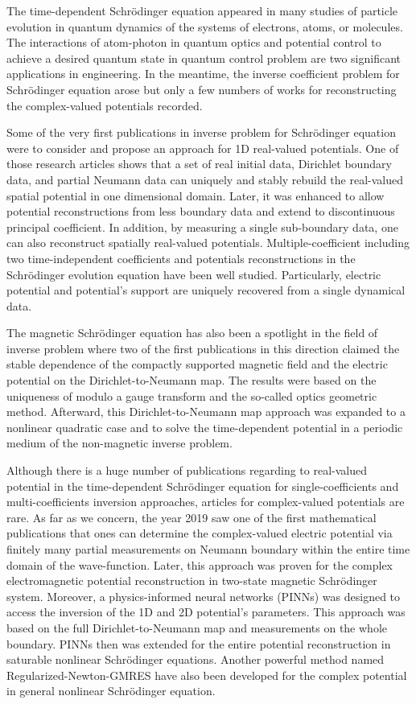 \documentclass[a4paper,fleqn]{cas-sc}
\begin{document}
The time-dependent Schr\"odinger equation appeared in many studies of particle evolution in quantum dynamics of the systems of electrons, atoms, or molecules. The interactions of atom-photon in quantum optics and potential control to achieve a desired quantum state in quantum control problem are two significant applications in engineering. In the meantime, the inverse coefficient problem for Schr\"odinger equation arose but only a few numbers of works for reconstructing the complex-valued potentials recorded.

Some of the very first publications in inverse problem for Schr\"odinger equation were to consider and propose an approach for 1D real-valued potentials. One of those research articles shows that a set of real initial data, Dirichlet boundary data, and partial Neumann data can uniquely and stably rebuild the real-valued spatial potential in one dimensional domain. Later, it was enhanced to allow potential reconstructions from less boundary data and extend to discontinuous principal coefficient. In addition, by measuring a single sub-boundary data, one can also reconstruct spatially real-valued potentials. Multiple-coefficient including two time-independent coefficients and potentials reconstructions in the Schr\"odinger evolution equation have been well studied. Particularly, electric potential and potential's support are  uniquely recovered from a single dynamical data.

The magnetic Schr\"odinger equation has also been a spotlight in the field of inverse problem where two of the first publications in this direction claimed the stable dependence of the compactly supported magnetic field and the electric potential on the Dirichlet-to-Neumann map. The results were based on the uniqueness of modulo a gauge transform and the so-called optics geometric method. Afterward, this Dirichlet-to-Neumann map approach was expanded to a nonlinear quadratic case and to solve the time-dependent potential in a periodic medium of the non-magnetic inverse problem.

Although there is a huge number of publications regarding to real-valued potential in the time-dependent Schr\"odinger equation for single-coefficients and multi-coefficients inversion approaches, articles for complex-valued potentials are rare. As far as we concern, the year 2019 saw one of the first mathematical publications that ones can determine the complex-valued electric potential via finitely many partial measurements on Neumann boundary within the entire time domain of the wave-function. Later, this approach was proven for the complex electromagnetic potential reconstruction in two-state magnetic Schr\"odinger system. Moreover, a physics-informed neural networks (PINNs) was designed to access the inversion of the 1D and 2D potential's parameters. This approach was based on the full Dirichlet-to-Neumann map and measurements on the whole boundary. PINNs then was extended for the entire potential reconstruction in saturable nonlinear Schr\"odinger equations. Another powerful method named Regularized-Newton-GMRES have also been developed for the complex potential in general nonlinear Schr\"odinger equation.
\end{document}
